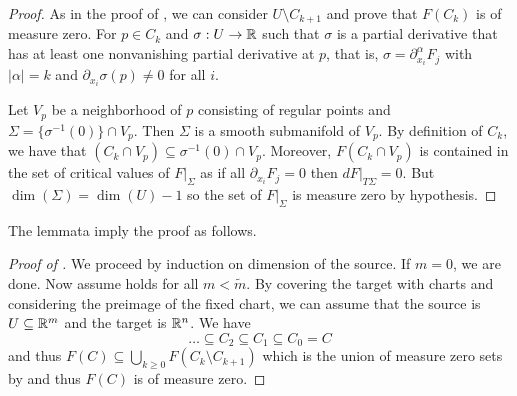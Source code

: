 \begin{proof}
    As in the proof of , we can consider $U\setminus C_{k+1}$ and prove that $F(C_{k})$ is of measure zero. For $p\in C_{k}$ and $\sigma:U\to\mathbb{R}$ such that $\sigma$ is a partial derivative that has at least one nonvanishing partial derivative at $p$, that is, $\sigma=\partial_{x_{i}}^{\alpha}F_{j}$ with $|\alpha|=k$ and $\partial_{x_{i}}\sigma(p)\neq0$ for all $i$. 

    Let $V_{p}$ be a neighborhood of $p$ consisting of regular points and $\Sigma=\{\sigma^{-1}(0)\}\cap V_{p}$. Then $\Sigma$ is a smooth submanifold of $V_{p}$. By definition of $C_{k}$, we have that $(C_{k}\cap V_{p})\subseteq\sigma^{-1}(0)\cap V_{p}$. Moreover, $F(C_{k}\cap V_{p})$ is contained in the set of critical values of $F|_{\Sigma}$ as if all $\partial_{x_{i}}F_{j}=0$ then $dF|_{T\Sigma}=0$. But $\dim(\Sigma)=\dim(U)-1$ so the set of $F|_{\Sigma}$ is measure zero by hypothesis.
\end{proof}
The lemmata imply the proof as follows. 
\begin{proof}[Proof of ]
    We proceed by induction on dimension of the source. If $m=0$, we are done. Now assume  holds for all $m<\widetilde{m}$. By covering the target with charts and considering the preimage of the fixed chart, we can assume that the source is $U\subseteq\mathbb{R}^{m}$ and the target is $\mathbb{R}^{n}$. We have 
    $$\dots\subseteq C_{2}\subseteq C_{1}\subseteq C_{0}=C$$
    and thus $F(C)\subseteq \bigcup_{k\geq 0}F(C_{k}\setminus C_{k+1})$ which is the union of measure zero sets by  and thus $F(C)$ is of measure zero.
\end{proof}
